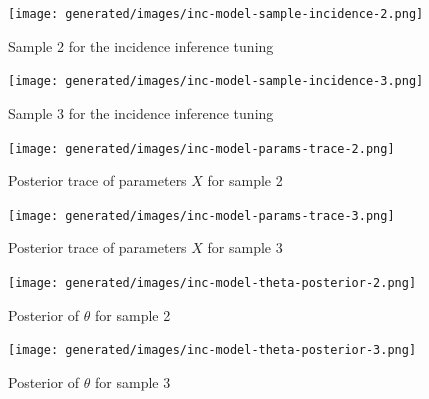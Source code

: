 \documentclass[
  digital, %
  oneside, %
  lof,     %
  lot,     %
]{fithesis4}
\begin{document}
\begin{figure}[H]
  \begin{center}
    \texttt{[image: generated/images/inc-model-sample-incidence-2.png]}
  \end{center}
  \caption{Sample 2 for the incidence inference tuning}
  \label{fig:dev-incidence-2}
\end{figure}

\begin{figure}[H]
  \begin{center}
    \texttt{[image: generated/images/inc-model-sample-incidence-3.png]}
  \end{center}
  \caption{Sample 3 for the incidence inference tuning}
  \label{fig:dev-incidence-3}
\end{figure}



\begin{figure}[H]
  \begin{center}
    \texttt{[image: generated/images/inc-model-params-trace-2.png]}
  \end{center}
  \caption{Posterior trace of parameters $X$ for sample 2}
  \label{fig:params-trace-2}
\end{figure}



\begin{figure}[H]
  \begin{center}
    \texttt{[image: generated/images/inc-model-params-trace-3.png]}
  \end{center}
  \caption{Posterior trace of parameters $X$ for sample 3}
  \label{fig:params-trace-3}
\end{figure}




\begin{figure}[H]
  \begin{center}
    \texttt{[image: generated/images/inc-model-theta-posterior-2.png]}
  \end{center}
  \caption{Posterior of $\theta$ for sample 2}
  \label{fig:theta-posterior-2}
\end{figure}

\begin{figure}[H]
  \begin{center}
    \texttt{[image: generated/images/inc-model-theta-posterior-3.png]}
  \end{center}
  \caption{Posterior of $\theta$ for sample 3}
  \label{fig:theta-posterior-3}
\end{figure}
\end{document}
